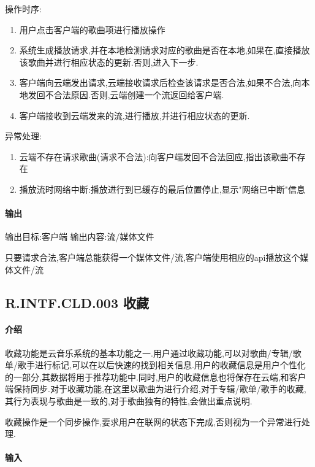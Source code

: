 操作时序:
\begin{enumerate}
	\item 用户点击客户端的歌曲项进行播放操作
	\item 系统生成播放请求,并在本地检测请求对应的歌曲是否在本地,如果在,直接播放该歌曲并进行相应状态的更新.否则,进入下一步.
	\item 客户端向云端发出请求,云端接收请求后检查该请求是否合法,如果不合法,向本地发回不合法原因.否则,云端创建一个流返回给客户端.
	\item 客户端接收到云端发来的流,进行播放,并进行相应状态的更新.
\end{enumerate}


异常处理:
\begin{enumerate}
	\item 云端不存在请求歌曲(请求不合法):向客户端发回不合法回应,指出该歌曲不存在
	\item 播放流时网络中断:播放进行到已缓存的最后位置停止,显示"网络已中断"信息
\end{enumerate}


\paragraph{输出}

输出目标:客户端
输出内容:流/媒体文件

只要请求合法,客户端总能获得一个媒体文件/流,客户端使用相应的api播放这个媒体文件/流


\subsection{R.INTF.CLD.003 收藏}

\paragraph{介绍}

收藏功能是云音乐系统的基本功能之一.用户通过收藏功能,可以对歌曲/专辑/歌单/歌手进行标记,可以在以后快速的找到相关信息.用户的收藏信息是用户个性化的一部分,其数据将用于推荐功能中.同时,用户的收藏信息也将保存在云端,和客户端保持同步.对于收藏功能,在这里以歌曲为进行介绍,对于专辑/歌单/歌手的收藏,其行为表现与歌曲是一致的,对于歌曲独有的特性,会做出重点说明.

收藏操作是一个同步操作,要求用户在联网的状态下完成,否则视为一个异常进行处理.

\paragraph{输入}

